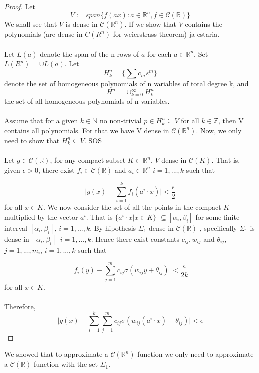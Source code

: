 \documentclass[../main.tex]{subfiles}
\begin{document}
	\begin{proof} %
			Let $$V:= span\{ f(ax) : a \in \mathbb{R}^n, f \in \mathcal{C}(\mathbb{R}) \}$$ We shall see that $V$ is dense in $\mathcal{C}(\mathbb{R}^n)$.  If we show that $V$ contains the polynomials (are dense in $C(R^n)$ for weierstrass theorem) ja estaria. \\ \\ 
			Let $L(a)$ denote the span of the n rows of $a$ for each $a\in \mathbb{R}^n$. Set $L(R^n) = \cup L(a)$. Let $$H_k^n= \{ \sum c_m s^m \}$$  denote the set of homogeneous polynomials of n variables of total degree k, and $$H^n= \cup_{k=0}^\infty H_k^n$$ the set of all homogeneous polynomials of n variables. \\  \\ 
			Assume that for a given $k\in \mathbb{N}$ no non-trivial $p\in H_k^n \subseteq V$ for all $k\in \mathbb{Z}$, then V contains all polynomials. For that we have V dense in $\mathcal{C}(\mathbb{R}^n)$. Now, we only need to show that $H_k^n \subseteq  V$. SOS
			\\ \\
			Let $g\in \mathcal{C}(\mathbb{R}) $, for any compact subset $K \subset \mathbb{R}^n  $, $V$ dense in $\mathcal{C}(K)$. That is, given $\epsilon >0$, there exist $f_i\in  \mathcal{C}(\mathbb{R})$ and $a_i \in \mathbb{R}^n $    {\scriptsize $i=1,...,k$}  such that
			
			$$ \big| g(x)-\sum_{i=1}^k f_i(a^i \cdot x) \big| < \frac{\epsilon}{2}$$
			for all $x\in K$. We now consider the set of all the points in the compact $K$ multiplied by the vector $a^i$. That is $\{a^i \cdot x | x \in K\}$ $\subseteq[\alpha_i,\beta_i] $ for some finite interval $[\alpha_i,\beta_i]$, $i=1,...,k$. By hipothesis $\Sigma_1 $ dense in $\mathcal{C}(\mathbb{R})$ , specifically $\Sigma_1 $ is dense in $[\alpha_i,\beta_i ]$ $ \, i=1,...,k$. Hence there exist constants $c_{ij}, w_{ij}$ and $\theta_{ij}$, $j=1,...,m_i$, $i=1,...,k$ such that 
			
			$$ \big| f_i(y) - \sum_{j=1}^{m} c_{ij} \sigma(w_{ij}y+ \theta_{ij})\big| < \frac{\epsilon}{2k}$$
			for all $x\in K$. \\ \\
			Therefore, 
			$$ \big| g(x) - \sum_{i=1}^k \sum_{j=1}^m c_{ij} \sigma(w_{ij}(a^i \cdot x) + \theta_{ij})  \big| < \epsilon$$
		\end{proof}
	We showed that to approximate a $\mathcal{C}(\mathbb{R}^n)$ function we only need to approximate a $\mathcal{C} (\mathbb{R})$ function with the set $\Sigma_1$. 
\end{document}
